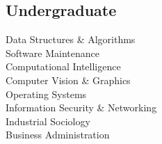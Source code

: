 \documentclass[]{resume}
\begin{document}
\begin{minipage}[t]{0.33\textwidth}
\subsection{Undergraduate}
Data Structures \& Algorithms \\
Software Maintenance \\
Computational Intelligence\\
Computer Vision \& Graphics \\
Operating Systems \\
Information Security \& Networking \\
Industrial Sociology \\
Business Administration
\sectionsep

\end{minipage}\quad %
\end{document}
